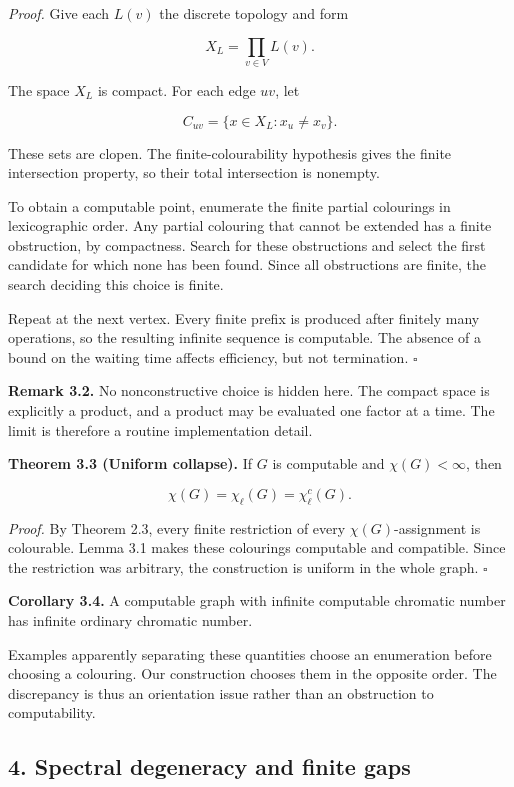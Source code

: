 \documentclass[11pt,letterpaper]{article}
\let\oldsubsection\subsection
\renewcommand{\subsection}{\Needspace{8\baselineskip}\oldsubsection}
\begin{document}
\emph{Proof.} Give each \(L(v)\) the discrete topology and form

\[
X_L=\prod_{v\in V}L(v).
\]

The space \(X_L\) is compact. For each edge \(uv\), let

\[
C_{uv}=\{x\in X_L:x_u\ne x_v\}.
\]

These sets are clopen. The finite-colourability hypothesis gives the finite intersection property, so their total intersection is nonempty.

To obtain a computable point, enumerate the finite partial colourings in lexicographic order. Any partial colouring that cannot be extended has a finite obstruction, by compactness. Search for these obstructions and select the first candidate for which none has been found. Since all obstructions are finite, the search deciding this choice is finite.

Repeat at the next vertex. Every finite prefix is produced after finitely many operations, so the resulting infinite sequence is computable. The absence of a bound on the waiting time affects efficiency, but not termination. \(\square\)

\textbf{Remark 3.2.} No nonconstructive choice is hidden here. The compact space is explicitly a product, and a product may be evaluated one factor at a time. The limit is therefore a routine implementation detail.

\textbf{Theorem 3.3 (Uniform collapse).} If \(G\) is computable and \(\chi(G)<\infty\), then

\[
\chi(G)=\chi_\ell(G)=\chi^c_\ell(G).
\]

\emph{Proof.} By Theorem 2.3, every finite restriction of every \(\chi(G)\)-assignment is colourable. Lemma 3.1 makes these colourings computable and compatible. Since the restriction was arbitrary, the construction is uniform in the whole graph. \(\square\)

\textbf{Corollary 3.4.} A computable graph with infinite computable chromatic number has infinite ordinary chromatic number.

Examples apparently separating these quantities choose an enumeration before choosing a colouring. Our construction chooses them in the opposite order. The discrepancy is thus an orientation issue rather than an obstruction to computability.

\subsection{4. Spectral degeneracy and finite gaps}\label{spectral-degeneracy-and-finite-gaps}
\end{document}
